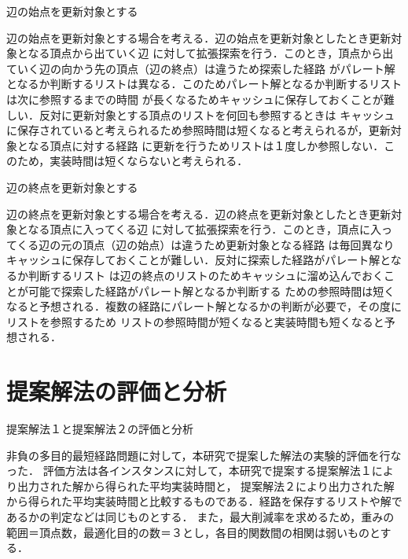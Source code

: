 \documentclass[12pt]{optlab-bachelor}
\begin{document}
\begin{description}
  \item[辺の始点を更新対象とする]
\end{description}

辺の始点を更新対象とする場合を考える．辺の始点を更新対象としたとき更新対象となる頂点から出ていく辺
に対して拡張探索を行う．このとき，頂点から出ていく辺の向かう先の頂点（辺の終点）は違うため探索した経路
がパレート解となるか判断するリストは異なる．このためパレート解となるか判断するリストは次に参照するまでの時間
が長くなるためキャッシュに保存しておくことが難しい．反対に更新対象とする頂点のリストを何回も参照するときは
キャッシュに保存されていると考えられるため参照時間は短くなると考えられるが，更新対象となる頂点に対する経路
に更新を行うためリストは１度しか参照しない．このため，実装時間は短くならないと考えられる．

\begin{description}
  \item[辺の終点を更新対象とする]
\end{description}

辺の終点を更新対象とする場合を考える．辺の終点を更新対象としたとき更新対象となる頂点に入ってくる辺
に対して拡張探索を行う．このとき，頂点に入ってくる辺の元の頂点（辺の始点）は違うため更新対象となる経路
は毎回異なりキャッシュに保存しておくことが難しい．反対に探索した経路がパレート解となるか判断するリスト
は辺の終点のリストのためキャッシュに溜め込んでおくことが可能で探索した経路がパレート解となるか判断する
ための参照時間は短くなると予想される．複数の経路にパレート解となるかの判断が必要で，その度にリストを参照するため
リストの参照時間が短くなると実装時間も短くなると予想される．

\section{提案解法の評価と分析}

\begin{description}
  \item[提案解法１と提案解法２の評価と分析]
\end{description}

非負の多目的最短経路問題に対して，本研究で提案した解法の実験的評価を行なった．
評価方法は各インスタンスに対して，本研究で提案する提案解法１により出力された解から得られた平均実装時間と，
提案解法２により出力された解から得られた平均実装時間と比較するものである．経路を保存するリストや解であるかの判定などは同じものとする．
また，最大削減率を求めるため，重みの範囲＝頂点数，最適化目的の数＝３とし，各目的関数間の相関は弱いものとする．
\end{document}
